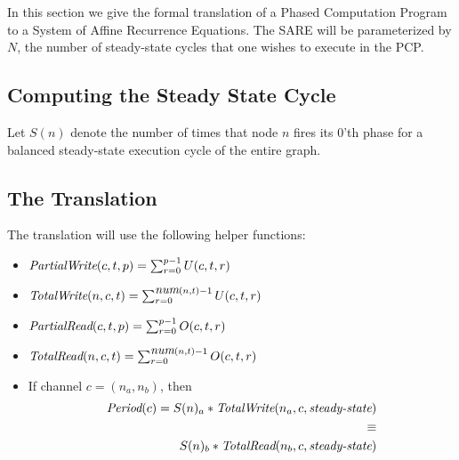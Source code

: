 In this section we give the formal translation of a Phased Computation
Program to a System of Affine Recurrence Equations.  The SARE will be
parameterized by $N$, the number of steady-state cycles that one
wishes to execute in the PCP.

\subsection{Computing the Steady State Cycle}

Let $S(n)$ denote the number of times that node $n$ fires its 0'th
phase for a balanced steady-state execution cycle of the entire graph.

\subsection{The Translation}

The translation will use the following helper functions:
\begin{itemize}

\item $\mbox{\it PartialWrite}(c,t,p) = \sum_{r=0}^{p-1} U(c, t, r)$

\item $\mbox{\it TotalWrite}(n,c,t) = \sum_{r=0}^{\mbox{\it num}(n, t)-1} U(c, t, r)$

\item $\mbox{\it PartialRead}(c,t,p) = \sum_{r=0}^{p-1} O(c, t, r)$

\item $\mbox{\it TotalRead}(n,c,t) =  \sum_{r=0}^{\mbox{\it num}(n, t)-1} O(c, t, r)$

\item If channel $c = (n_a, n_b)$, then 
\begin{align*}
\mbox{\it Period}(c) = S(n)_a * \mbox{\it TotalWrite}(n_a, c, \mbox{\it steady-state}) \\
\equiv \\
S(n)_b * \mbox{\it TotalRead}(n_b, c, \mbox{\it steady-state})
\end{align*}

\end{itemize}

